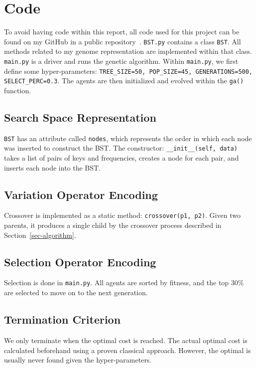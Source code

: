
\section{Code}

To avoid having code within this report, all code used for this project can be found on my GitHub in a public repository~\cite{project_repository}. \texttt{BST.py} contains a class \texttt{BST}. All methods related to my genome representation are implemented within that class. \texttt{main.py} is a driver and runs the genetic algorithm. Within \texttt{main.py}, we first define some hyper-parameters: \texttt{TREE\_SIZE=50, POP\_SIZE=45, GENERATIONS=500, SELECT\_PERC=0.3}. The agents are then initialized and evolved within the \texttt{ga()} function.

\subsection{Search Space Representation}

 \texttt{BST} has an attribute called \texttt{nodes}, which represents the order in which each node was inserted to construct the BST. The constructor: \texttt{\_\_init\_\_(self, data)} takes a list of pairs of keys and frequencies, creates a node for each pair, and inserts each node into the BST.

 \subsection{Variation Operator Encoding}
Crossover is implemented as a static method: \texttt{crossover(p1, p2)}. Given two parents, it produces a single child by the crossover process described in Section~\ref{sec-algorithm}.

 \subsection{Selection Operator Encoding}
Selection is done in \texttt{main.py}. All agents are sorted by fitness, and the top 30\% are selected to move on to the next generation.

 \subsection{Termination Criterion}
We only terminate when the optimal cost is reached. The actual optimal cost is calculated beforehand using a proven classical approach. However, the optimal is usually never found given the hyper-parameters.
